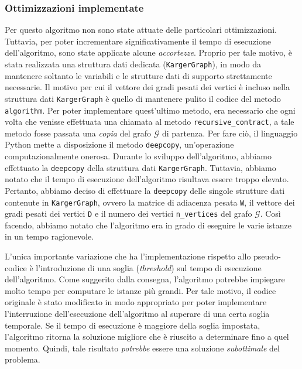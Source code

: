 \subsubsection{Ottimizzazioni implementate}
Per questo algoritmo non sono state attuate delle particolari ottimizzazioni. Tuttavia, 
per poter incrementare significativamente il tempo di esecuzione dell'algoritmo, sono 
state applicate alcune \textit{accortezze}. Proprio per tale motivo, è stata realizzata 
una struttura dati dedicata (\verb|KargerGraph|), in modo da mantenere soltanto le 
variabili e le strutture dati di supporto strettamente necessarie. Il motivo per cui il 
vettore dei gradi pesati dei vertici è incluso nella struttura dati \verb|KargerGraph| 
è quello di mantenere pulito il codice del metodo 
\verb|algorithm|. Per poter implementare quest'ultimo metodo, era necessario che ogni 
volta che venisse effettuata una chiamata al metodo \verb|recursive_contract|, a 
tale metodo fosse passata una \textit{copia} del grafo $\mathcal{G}$ di partenza. 
Per fare ciò, il linguaggio Python mette a disposizione il metodo \verb|deepcopy|, 
un'operazione computazionalmente onerosa. Durante lo sviluppo dell'algoritmo, abbiamo 
effettuato la \verb|deepcopy| della struttura dati \verb|KargerGraph|. Tuttavia, abbiamo 
notato che il tempo di esecuzione dell'algoritmo risultava essere troppo elevato. 
Pertanto, abbiamo deciso di effettuare la \verb|deepcopy| delle singole strutture dati 
contenute in \verb|KargerGraph|, ovvero la matrice di adiacenza pesata \verb|W|, il 
vettore dei gradi pesati dei vertici \verb|D| e il numero dei vertici \verb|n_vertices|
del grafo $\mathcal{G}$. Così facendo, abbiamo notato che l'algoritmo era in grado di 
eseguire le varie istanze in un tempo ragionevole.

L'unica importante variazione che ha l'implementazione rispetto allo pseudo-codice è 
l'introduzione di una soglia (\textit{threshold}) sul tempo di esecuzione dell'algoritmo. 
Come suggerito dalla consegna, l'algoritmo potrebbe impiegare molto tempo per computare 
le istanze più grandi. Per tale motivo, il codice originale è stato modificato in modo 
appropriato per poter implementare l'interruzione dell'esecuzione dell'algoritmo al 
superare di una certa soglia temporale. Se il tempo di esecuzione è maggiore della 
soglia impostata, l'algoritmo ritorna la soluzione migliore che è riuscito a determinare 
fino a quel momento. Quindi, tale risultato \textit{potrebbe} essere una soluzione 
\textit{subottimale} del problema.
